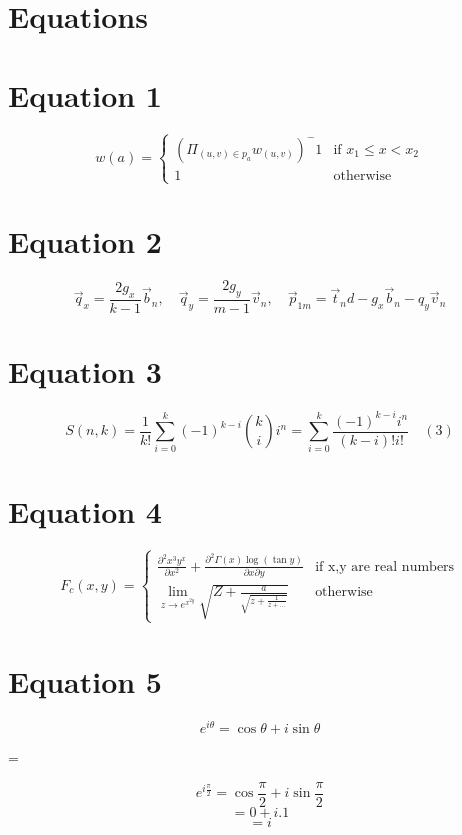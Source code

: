 \documentclass{article}
\begin{document}
\section{Equations}
\section*{\textbf{Equation 1}}
$$
    w(a) = 
        \begin{cases} 
        (\Pi_{(u,v)\in p_a} w_{(u,v)})^-1 & \text{if } x_1 \leq x < x_2 \\
        1    & \text{otherwise} 
\end{cases}
$$

\section*{\textbf{Equation 2}}
\[\vec{q}_x = \frac{2g_x}{k-1}\vec{b}_n, \quad \vec{q}_y = \frac{2g_y}{m-1}\vec{v}_n, \quad \vec{p}_{1m} = \vec{t}_n d - g_x\vec{b}_n - q_y\vec{v}_n\]

\section*{\textbf{Equation 3}}
\[S(n,k) = \frac{1}{k!}\sum_{i=0}^k (-1)^{k-i}\binom{k}{i}i^n = \sum_{i=0}^k \frac{(-1)^{k-i} i^n}{(k-i)!i!} \quad (3)\]

\section*{ Equation 4}
\[F_c(x,y) = \begin{cases} 
\frac{\partial^2 x^3y^x}{\partial x^2} + \frac{\partial^2\Gamma(x)\log(\tan y)}{\partial x\partial y} & \text{if x,y are real numbers} \\[10pt]
\displaystyle\lim_{z \to e^{x^{2y}}}\sqrt{Z + \frac{a}{\sqrt{z + \frac{1}{z+...}}}} & \text{otherwise}
\end{cases}\]

\section*{ Equation 5}
\[e^{i\theta} = \cos \theta + i \sin \theta\]

 \theta =  

\[e^{i\frac{\pi}{2}} = \cos \frac{\pi}{2} + i \sin \frac{\pi}{2}\]
\[= 0 + i.1\]
\[= i\]
\end{document}
